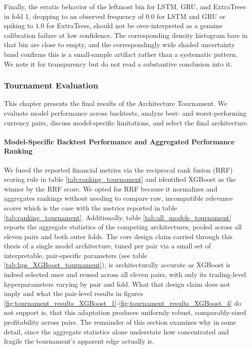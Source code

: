 \documentclass[12pt, a4paper]{article}
\begin{document}
\medskip

Finally, the erratic behavior of the leftmost bin for LSTM, GRU, and ExtraTrees in fold 1, dropping to an observed frequency of $0.0$ for LSTM and GRU or spiking to $1.0$ for 
ExtraTrees, should not be over-interpreted as a genuine calibration failure at low confidence. The corresponding density histogram bars in that bin are close to empty, and the 
correspondingly wide shaded uncertainty band confirms this is a small-sample artifact rather than a systematic pattern. We note it for transparency but do not read a substantive 
conclusion into it.


\subsubsection{Tournament Evaluation}

This chapter presents the final results of the Architecture Tournament.
We evaluate model performance across backtests, analyze best- and worst-performing currency pairs, discuss model-specific limitations, and select the final architecture.

\paragraph{Model-Specific Backtest Performance and Aggregated Performance Ranking}\hspace{0pt}\label{sec:backtests_tournament}

We fused the reported financial metrics via the reciprocal rank fusion (RRF) scoring rule in table \ref{tab:ranking_tournament} and identified XGBoost as the winner by the RRF score. 
We opted for RRF because it normalizes and aggregates rankings without needing to compare raw, incompatible relevance scores which is the case with the metrics reported in 
table \ref{tab:ranking_tournament}. Additionally, table \ref{tab:all_models_tournament} reports the aggregate statistics of the competing architectures, pooled across all eleven 
pairs and both outer folds. The core design claim carried through this thesis of a single model architecture, tuned per pair via a small set of interpretable, pair-specific parameters 
(see table \ref{tab:hps_XGBoost_tournament}), is architecturally accurate as XGBoost is indeed selected once and reused across all eleven pairs, with only its trading-level 
hyperparameters varying by pair and fold. What that design claim does not imply and what the pair-level results in figures 
\ref{fig:tournament_results_XGBoost_1}-\ref{fig:tournament_results_XGBoost_4} do not support is, that this adaptation produces uniformly robust, comparably-sized 
profitability across pairs. The remainder of this section examines why in some detail, since the aggregate statistics alone understate how concentrated and 
fragile the tournament's apparent edge actually is.
\end{document}
